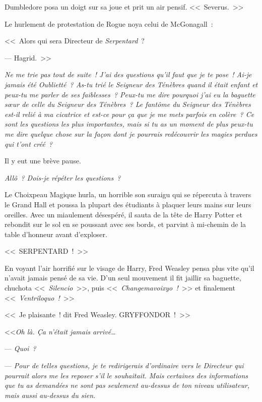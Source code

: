 Dumbledore posa un doigt sur sa joue et prit un air pensif. <<~Severus.~>>

Le hurlement de protestation de Rogue noya celui de McGonagall~:

<<~Alors qui sera Directeur de \emph{Serpentard}~?

--- Hagrid.~>>

\later

\emph{Ne me trie pas tout de suite~! J'ai des questions qu'il faut que je te pose~! Ai-je jamais été Oublietté~? As-tu trié le Seigneur des Ténèbres quand il était enfant et peux-tu me parler de ses faiblesses~? Peux-tu me dire pourquoi j'ai eu la baguette sœur de celle du Seigneur des Ténèbres~? Le fantôme du Seigneur des Ténèbres est-il relié à ma cicatrice et est-ce pour ça que je me mets parfois en colère~? Ce sont les questions les plus importantes, mais si tu as un moment de plus peux-tu me dire quelque chose sur la façon dont je pourrais redécouvrir les magies perdues qui t'ont créé~?}

Il y eut une brève pause.

\emph{Allô~? Dois-je répéter les questions~?}

Le Choixpeau Magique hurla, un horrible son suraigu qui se répercuta à travers le Grand Hall et poussa la plupart des étudiants à plaquer leurs mains sur leurs oreilles. Avec un miaulement désespéré, il sauta de la tête de Harry Potter et rebondit sur le sol en se poussant avec ses bords, et parvint à mi-chemin de la table d'honneur avant d'exploser.

\later

<<~SERPENTARD~!~>>

En voyant l'air horrifié sur le visage de Harry, Fred Weasley pensa plus vite qu'il n'avait jamais pensé de sa vie. D'un seul mouvement il fit jaillir sa baguette, chuchota <<~\emph{Silencio}~>>, puis <<~\emph{Changemavoixyo~!}~>> et finalement <<~\emph{Ventriloquo~!}~>>

<<~Je plaisante~! dit Fred Weasley. GRYFFONDOR~!~>>

\later

<<\emph{Oh là. Ça n'était jamais arrivé…}

--- \emph{Quoi~?}

--- \emph{Pour de telles questions, je te redirigerais d'ordinaire vers le Directeur qui pourrait alors me les reposer s'il le souhaitait. Mais certaines des informations que tu as demandées ne sont pas seulement au-dessus de ton niveau utilisateur, mais aussi au-dessus du sien.}

